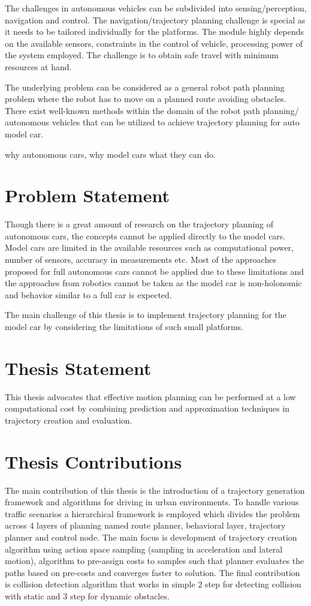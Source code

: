 The challenges in autonomous vehicles can be subdivided into sensing/perception, navigation and control. The navigation/trajectory planning challenge is special as it needs to be tailored individually for the platforms. The module highly depends on the available sensors, constraints in the control of vehicle, processing power of the system employed.  The challenge is to obtain safe travel with minimum resources at hand. 

The underlying problem can be considered as a general robot path planning problem where the robot has to move on a planned route avoiding obstacles. There exist well-known methods within the domain of the robot path planning/ autonomous vehicles that can be utilized to achieve trajectory planning for auto model car. 

why autonomous cars, why model cars what they can do.

\section{Problem Statement}

Though there is a great amount of research on the trajectory planning of autonomous cars, the concepts cannot be applied directly to the model cars. Model cars are limited in the available resources such as computational power, number of sensors, accuracy in measurements etc. Most of the approaches proposed for full autonomous cars cannot be applied due to these limitations and the approaches from robotics cannot be taken as the model car is non-holonomic and behavior similar to a full car is expected. 

The main challenge of this thesis is to implement trajectory planning for the model car by considering the limitations of such small platforms. 

\section{Thesis Statement}
This thesis advocates that effective motion planning can be performed at a low computational cost by combining prediction and approximation techniques in trajectory creation and evaluation. 

\section{Thesis Contributions}

The main contribution of this thesis is the introduction of a trajectory generation framework and algorithms for driving in urban environments. To handle various traffic scenarios a hierarchical framework is employed which divides the problem across 4 layers of planning named route planner, behavioral layer, trajectory planner and control node. The main focus is development of trajectory creation algorithm using action space sampling (sampling in acceleration and lateral motion), algorithm to pre-assign costs to samples such that planner evaluates the paths based on pre-costs and converges faster to solution. The final contribution is collision detection algorithm that works in simple 2 step for detecting collision with static and 3 step for dynamic obstacles. 

